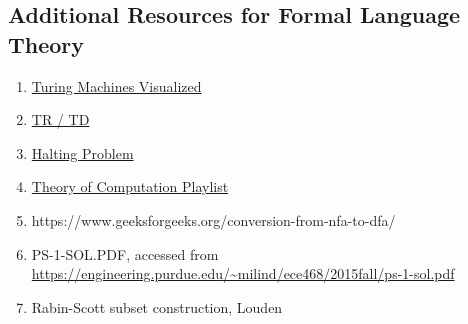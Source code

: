 \documentclass{article}
\begin{document}
\subsection*{Additional Resources for Formal Language Theory}
\begin{enumerate}
    \item \href{https://www.youtube.com/watch?v=-ZS_zFg4w5k}{Turing Machines Visualized}
    \item \href{https://www.youtube.com/watch?v=sNWC1Zz6qcg}{TR / TD}
    \item \href{https://www.youtube.com/watch?v=VyHbd6sx5Po}{Halting Problem}
    \item \href{https://www.youtube.com/watch?v=SV57Yv8BXBc&list=PLhqug0UEsC-IDomfNsn8e3neoy34o8oye}{Theory of Computation Playlist}
	\item https://www.geeksforgeeks.org/conversion-from-nfa-to-dfa/ 
	\item PS-1-SOL.PDF, accessed from \url{https://engineering.purdue.edu/~milind/ece468/2015fall/ps-1-sol.pdf}
	\item Rabin-Scott subset construction, Louden
\end{enumerate}
\end{document}

